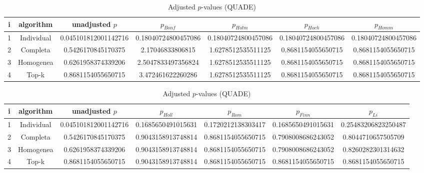 \documentclass[a4paper,10pt]{article}
\begin{document}
\begin{landscape}
\newpage

\begin{table}[!htp]
\centering\scriptsize
\caption{Adjusted $p$-values (QUADE)}
\begin{tabular}{ccccccc}
i&algorithm&unadjusted $p$&$p_{Bonf}$&$p_{Holm}$&$p_{Hoch}$&$p_{Homm}$\\
\hline
1&Individual&0.045101812001142716&0.18040724800457086&0.18040724800457086&0.18040724800457086&0.18040724800457086\\
2&Completa&0.5426170845170375&2.17046833806815&1.6278512535511125&0.8681154055650715&0.8681154055650715\\
3&Homogenea&0.6261958374339206&2.5047833497356824&1.6278512535511125&0.8681154055650715&0.8681154055650715\\
4&Top-k&0.8681154055650715&3.472461622260286&1.6278512535511125&0.8681154055650715&0.8681154055650715\\
\hline
\end{tabular}
\end{table}

\begin{table}[!htp]
\centering\scriptsize
\caption{Adjusted $p$-values (QUADE)}
\begin{tabular}{ccccccc}
i&algorithm&unadjusted $p$&$p_{Holl}$&$p_{Rom}$&$p_{Finn}$&$p_{Li}$\\
\hline
1&Individual&0.045101812001142716&0.1685650491015631&0.1720212138303417&0.1685650491015631&0.25483206823250487\\
2&Completa&0.5426170845170375&0.9043158913748814&0.8681154055650715&0.7908008686243052&0.8044710657505709\\
3&Homogenea&0.6261958374339206&0.9043158913748814&0.8681154055650715&0.7908008686243052&0.8260282301314632\\
4&Top-k&0.8681154055650715&0.9043158913748814&0.8681154055650715&0.8681154055650715&0.8681154055650715\\
\hline
\end{tabular}
\end{table}

\end{landscape}
\end{document}
